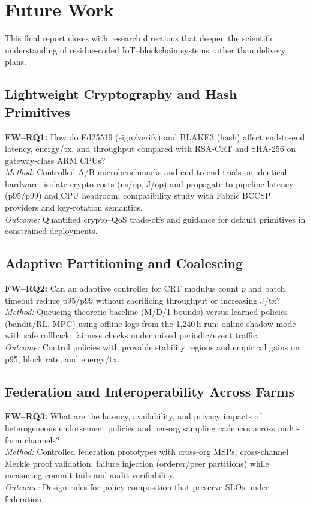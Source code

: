 \documentclass[12pt,onecolumn]{IEEEtran} %
\begin{document}
\section{Future Work}
\label{sec:future-work}

This final report closes with research directions that deepen the scientific understanding of residue-coded IoT–blockchain systems rather than delivery plans.

\subsection{Lightweight Cryptography and Hash Primitives}
\textbf{FW–RQ1:} How do Ed25519 (sign/verify) and BLAKE3 (hash) affect end-to-end latency, energy/tx, and throughput compared with RSA-CRT and SHA-256 on gateway-class ARM CPUs? \\
\textit{Method:} Controlled A/B microbenchmarks and end-to-end trials on identical hardware; isolate crypto costs (ns/op, J/op) and propagate to pipeline latency (p95/p99) and CPU headroom; compatibility study with Fabric BCCSP providers and key-rotation semantics. \\
\textit{Outcome:} Quantified crypto–QoS trade-offs and guidance for default primitives in constrained deployments.

\subsection{Adaptive Partitioning and Coalescing}
\textbf{FW–RQ2:} Can an adaptive controller for CRT modulus count $p$ and batch timeout reduce p95/p99 without sacrificing throughput or increasing J/tx? \\
\textit{Method:} Queueing-theoretic baseline (M/D/1 bounds) versus learned policies (bandit/RL, MPC) using offline logs from the 1{,}240\,h run; online shadow mode with safe rollback; fairness checks under mixed periodic/event traffic. \\
\textit{Outcome:} Control policies with provable stability regions and empirical gains on p95, block rate, and energy/tx.

\subsection{Federation and Interoperability Across Farms}
\textbf{FW–RQ3:} What are the latency, availability, and privacy impacts of heterogeneous endorsement policies and per-org sampling cadences across multi-farm channels? \\
\textit{Method:} Controlled federation prototypes with cross-org MSPs; cross-channel Merkle proof validation; failure injection (orderer/peer partitions) while measuring commit tails and audit verifiability. \\
\textit{Outcome:} Design rules for policy composition that preserve SLOs under federation.
\end{document}

